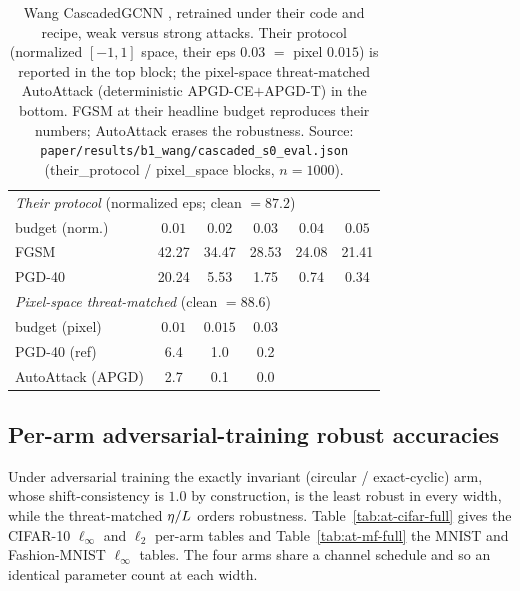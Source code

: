 \begin{table}[t]\centering
\caption{Wang CascadedGCNN \citep{wang2025bridging}, retrained under their code
and recipe, weak versus strong attacks. Their protocol (normalized $[-1,1]$
space, their eps $0.03$ $=$ pixel $0.015$) is reported in the top block; the
pixel-space threat-matched AutoAttack (deterministic APGD-CE$+$APGD-T) in the
bottom. FGSM at their headline budget reproduces their numbers; AutoAttack erases
the robustness. Source:
\texttt{paper/results/b1\_wang/cascaded\_s0\_eval.json}
(their\_protocol / pixel\_space blocks, $n=1000$).}
\label{tab:wang-weak}
\footnotesize
\begin{tabular}{lccccc}
\toprule
\multicolumn{6}{l}{\emph{Their protocol} (normalized eps; clean $=87.2$)}\\
budget (norm.) & $0.01$ & $0.02$ & $0.03$ & $0.04$ & $0.05$ \\
FGSM   & 42.27 & 34.47 & 28.53 & 24.08 & 21.41 \\
PGD-40 & 20.24 &  5.53 &  1.75 &  0.74 &  0.34 \\
\midrule
\multicolumn{6}{l}{\emph{Pixel-space threat-matched} (clean $=88.6$)}\\
budget (pixel) & $0.01$ & $0.015$ & $0.03$ & & \\
PGD-40 (ref)   & 6.4 & 1.0 & 0.2 & & \\
AutoAttack (APGD) & 2.7 & 0.1 & 0.0 & & \\
\bottomrule
\end{tabular}
\end{table}

\subsection{Per-arm adversarial-training robust accuracies}\label{app:at-tables-full}
Under adversarial training the exactly invariant (circular / exact-cyclic) arm,
whose shift-consistency is $1.0$ by construction, is the least robust in every
width, while the threat-matched $\eta/L$ orders robustness. Table~\ref{tab:at-cifar-full}
gives the CIFAR-10 $\ell_\infty$ and $\ell_2$ per-arm tables and
Table~\ref{tab:at-mf-full} the MNIST and Fashion-MNIST $\ell_\infty$ tables. The
four arms share a channel schedule and so an identical parameter count at each
width.

